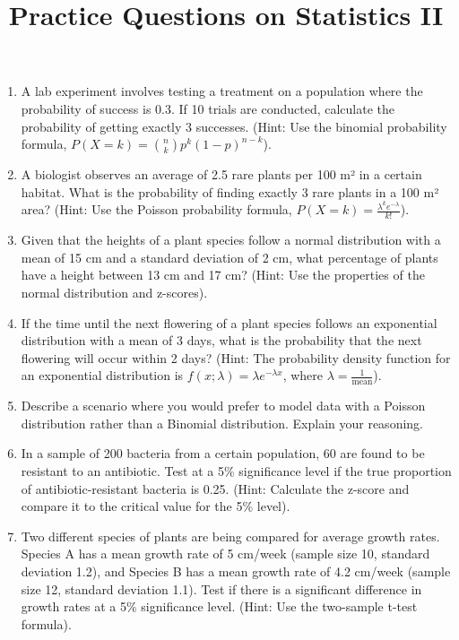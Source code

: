 \documentclass[11pt]{article}
\title{Practice Questions on Statistics II}
\author{}
\begin{document}
\maketitle
\thispagestyle{fancy}


\begin{enumerate}
    \item A lab experiment involves testing a treatment on a population where the probability of success is 0.3. If 10 trials are conducted, calculate the probability of getting exactly 3 successes. (Hint: Use the binomial probability formula, $P (X = k) = \binom{n}{k} p^k (1 - p)^{n-k}$).

    \item A biologist observes an average of 2.5 rare plants per 100 m² in a certain habitat. What is the probability of finding exactly 3 rare plants in a 100 m² area? (Hint: Use the Poisson probability formula, $P (X = k) = \frac{\lambda^k e^{-\lambda}}{k!}$).

    \item Given that the heights of a plant species follow a normal distribution with a mean of 15 cm and a standard deviation of 2 cm, what percentage of plants have a height between 13 cm and 17 cm? (Hint: Use the properties of the normal distribution and z-scores).

    \item If the time until the next flowering of a plant species follows an exponential distribution with a mean of 3 days, what is the probability that the next flowering will occur within 2 days? (Hint: The probability density function for an exponential distribution is $f (x; \lambda) = \lambda e^{-\lambda x}$, where $\lambda = \frac{1}{\text{mean}}$).

    \item Describe a scenario where you would prefer to model data with a Poisson distribution rather than a Binomial distribution. Explain your reasoning.

    \item In a sample of 200 bacteria from a certain population, 60 are found to be resistant to an antibiotic. Test at a 5\% significance level if the true proportion of antibiotic-resistant bacteria is 0.25. (Hint: Calculate the z-score and compare it to the critical value for the 5\% level).

    \item Two different species of plants are being compared for average growth rates. Species A has a mean growth rate of 5 cm/week (sample size 10, standard deviation 1.2), and Species B has a mean growth rate of 4.2 cm/week (sample size 12, standard deviation 1.1). Test if there is a significant difference in growth rates at a 5\% significance level. (Hint: Use the two-sample t-test formula).


\end{enumerate}
\end{document}
